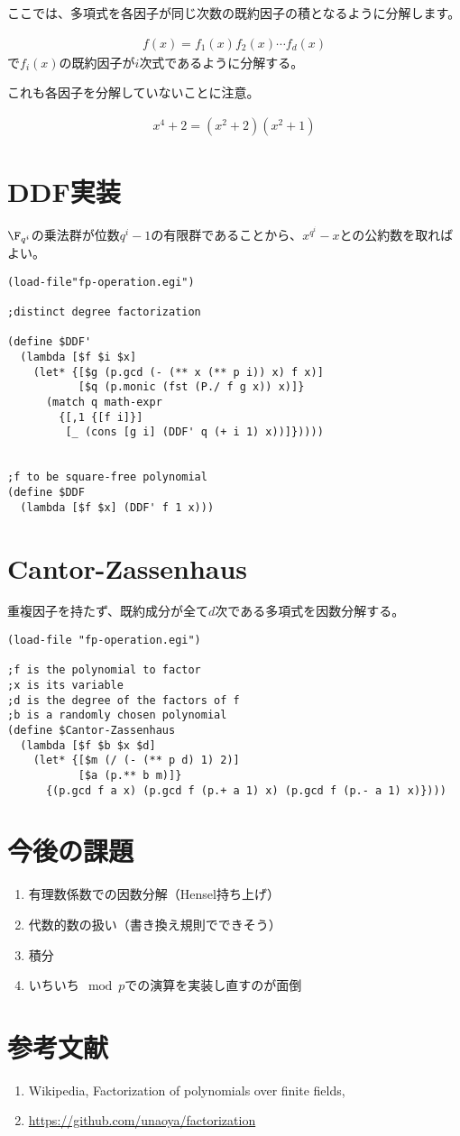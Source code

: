 \documentclass[uplatex]{jsarticle}
\begin{document}
ここでは、多項式を各因子が同じ次数の既約因子の積となるように分解します。

\begin{align*}
f(x)=f_1(x)f_2(x)\cdots f_d(x)
\end{align*}
で$f_i(x)$の既約因子が$i$次式であるように分解する。

これも各因子を分解していないことに注意。

\begin{align*}
x^4+2=(x^2+2)(x^2+1)
\end{align*}

\section{DDF実装}
$\F_{q^i}$の乗法群が位数$q^i-1$の有限群であることから、$x^{q^i}-x$との公約数を取ればよい。

{\footnotesize
\begin{verbatim}
(load-file"fp-operation.egi")

;distinct degree factorization

(define $DDF'
  (lambda [$f $i $x]
    (let* {[$g (p.gcd (- (** x (** p i)) x) f x)]
           [$q (p.monic (fst (P./ f g x)) x)]}
      (match q math-expr
        {[,1 {[f i]}]
         [_ (cons [g i] (DDF' q (+ i 1) x))]}))))


;f to be square-free polynomial
(define $DDF
  (lambda [$f $x] (DDF' f 1 x)))
\end{verbatim}
}

\section{Cantor-Zassenhaus}
重複因子を持たず、既約成分が全て$d$次である多項式を因数分解する。

{\footnotesize
\begin{verbatim}
(load-file "fp-operation.egi")

;f is the polynomial to factor
;x is its variable
;d is the degree of the factors of f
;b is a randomly chosen polynomial
(define $Cantor-Zassenhaus
  (lambda [$f $b $x $d]
    (let* {[$m (/ (- (** p d) 1) 2)]
           [$a (p.** b m)]}
      {(p.gcd f a x) (p.gcd f (p.+ a 1) x) (p.gcd f (p.- a 1) x)})))
\end{verbatim}
}






\section{今後の課題}
\begin{enumerate}
\item 有理数係数での因数分解（Hensel持ち上げ）
\item 代数的数の扱い（書き換え規則でできそう）
\item 積分
\item いちいち$\mod p$での演算を実装し直すのが面倒
\end{enumerate}

\section{参考文献}
\begin{enumerate}
\item Wikipedia, Factorization of polynomials over finite fields,
\item \url{https://github.com/unaoya/factorization}
\end{enumerate}
\end{document}
